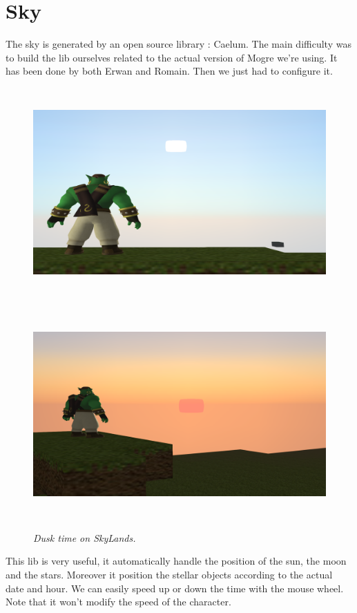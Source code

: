 \documentclass[article]{report} %
\begin{document}
			\section{Sky}
				The sky is generated by an open source library : Caelum. The main difficulty was to build the lib ourselves related to the actual version of \ac{Mogre} we're using. It has been done by both Erwan and Romain. Then we just had to configure it.\\

			\begin{figure}[h]
				\includegraphics[width=15cm, height=8cm]{images/Screenshots/BackPerso-Sun.png}
\begin{center}\it \end{center}
				\includegraphics[width=15cm, height=8cm]{images/Screenshots/SunSet01.png}
				\begin{center}\it Dusk time on SkyLands. \end{center}
			\end{figure}
This lib is very useful, it automatically handle the position of the sun, the moon and the stars. Moreover it position the stellar objects according to the actual date and hour. We can easily speed up or down the time with the mouse wheel. Note that it won't modify the speed of the character.
\newpage
\end{document}
